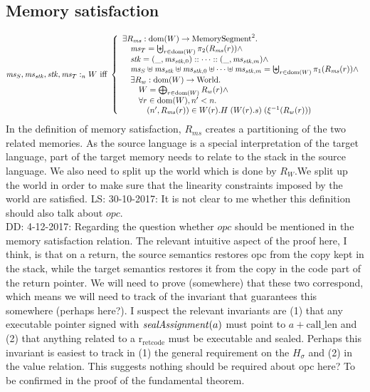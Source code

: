 \documentclass[a3paper]{article}
\newcommand\lau[1]{{\color{purple} \sf \footnotesize {LS: #1}}\\}
\newcommand\dominique[1]{{\color{purple} \sf \footnotesize {DD: #1}}\\}
\newcommand{\dom}{\mathrm{dom}}
\newcommand{\npair}[2][n]{\left(#1,#2\right)}
\newcommand{\fun}{\rightarrow}
\newcommand{\memSat}[3][n]{#2 :_{#1}#3}
\newcommand{\World}{\mathrm{World}}
\newcommand{\shareddom}[1]{\mathrm{#1}}
\newcommand{\MemSeg}{\shareddom{MemorySegment}}
\newcommand{\var}[1]{\mathit{#1}}
\newcommand{\ms}{\var{ms}}
\newcommand{\stk}{\var{stk}}
\newcommand{\opc}{\var{opc}}
\newcommand{\constant}[1]{\mathrm{#1}}
\newcommand{\calllen}{\constant{call\_len}}
\newcommand{\rretc}{\mathrm{r}_\mathrm{ret code}}
\newcommand{\plainfun}[2]{
  \ifthenelse{\equal{#2}{}}
  {\mathit{#1}}
  {\mathit{#1}(#2)}
}
\newcommand{\sealAss}[1]{\plainfun{sealAssignment}{#1}}
\begin{document}
\subsection{Memory satisfaction}
\[
  \memSat{\ms_S,\ms_\stk,\stk,\ms_T}{W} \text{ iff } 
  \left\{
    \begin{array}{l}
      \exists R_\ms : \dom(W) \fun \MemSeg^2 \ldotp \\
      \quad \ms_T = \biguplus_{r \in \dom(W)} \pi_2(R_\ms(r)) \wedge \\
      \quad \stk = (\_,\ms_{\stk,0}) :: \dots :: (\_,\ms_{\stk,m}) \wedge \\
      \quad \ms_S \uplus \ms_\stk \uplus \ms_{\stk,0} \uplus \dots \uplus \ms_{\stk,m} = \biguplus_{r \in \dom(W)} \pi_1(R_\ms(r)) \wedge \\
      \quad \exists R_w : \dom(W) \fun \World \ldotp\\
      \qquad W = \bigoplus_{r \in \dom(W)} R_w(r) \wedge \\
      \qquad \forall r \in \dom(W) , n' < n \ldotp \\
      \quad \qquad \npair[n']{R_\ms(r)} \in W(r).H \; (W(r).s) \; (\xi^{-1} (R_w (r))) 
    \end{array}
  \right.
\]
In the definition of memory satisfaction, $R_\ms$ creates a partitioning of the two related memories. As the source language is a special interpretation of the target language, part of the target memory needs to relate to the stack in the source language. We also need to split up the world which is done by $R_W$.We split up the world in order to make sure that the linearity constraints imposed by the world are satisfied.
\lau{30-10-2017: It is not clear to me whether this definition should also talk about $\opc$.}
\dominique{4-12-2017: Regarding the question whether $\opc$ should be mentioned in the memory satisfaction relation.
  The relevant intuitive aspect of the proof here, I think, is that on a return, the source semantics restores opc from the copy kept in the stack, while the target semantics restores it from the copy in the code part of the return pointer.
  We will need to prove (somewhere) that these two correspond, which means we will need to track of the invariant that guarantees this somewhere (perhaps here?).
  I suspect the relevant invariants are (1) that any executable pointer signed with $\sealAss{a}$ must point to $a + \calllen$ and (2) that anything related to a $\rretc$ must be executable and sealed.
  Perhaps this invariant is easiest to track in (1) the general requirement on the $H_\sigma$ and (2) in the value relation.
  This suggests nothing should be required about opc here?
  To be confirmed in the proof of the fundamental theorem.
}
\end{document}
